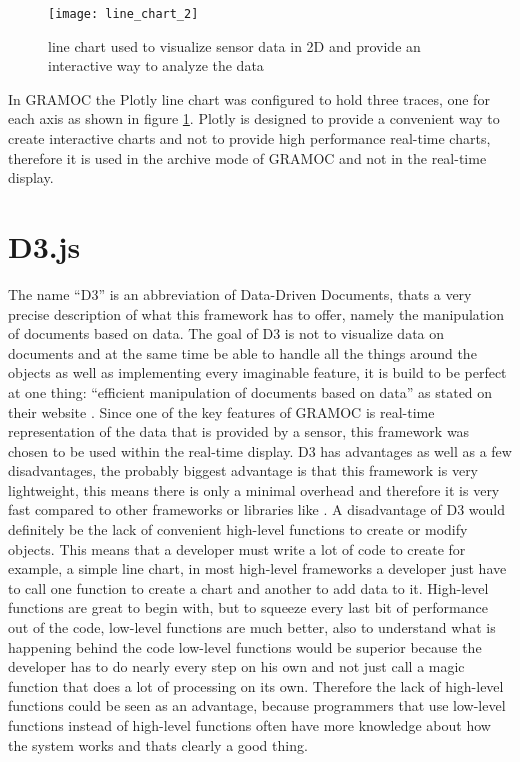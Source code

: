\begin{figure}[H]
    \centering
    \texttt{[image: line\_chart\_2]}
    \caption{line chart used to visualize sensor data in 2D and provide an interactive way to analyze the data}
    \label{fig:plotlylinechart}
\end{figure}

In GRAMOC the Plotly line chart was configured to hold three traces, one for each axis as shown in figure \ref{fig:plotlylinechart}. Plotly is designed to provide a convenient way to create interactive charts and not to provide high performance real-time charts, therefore it is used in the archive mode of GRAMOC and not in the real-time display.

\section{D3.js}
The name ``D3'' is an abbreviation of Data-Driven Documents, thats a very precise description of what this framework has to offer, namely the manipulation of documents based on data. The goal of D3 is not to visualize data on documents and at the same time be able to handle all the things around the objects as well as implementing every imaginable feature, it is build to be perfect at one thing: ``efficient manipulation of documents based on data'' as stated on their website \autocite{d3}. Since one of the key features of GRAMOC is real-time representation of the data that is provided by a sensor, this framework was chosen to be used within the real-time display. D3 has advantages as well as a few disadvantages, the probably biggest advantage is that this framework is very lightweight, this means there is only a minimal overhead and therefore it is very fast compared to other frameworks or libraries like . A disadvantage of D3 would definitely be the lack of convenient high-level functions to create or modify objects. This means that a developer must write a lot of code to create for example, a simple line chart, in most high-level frameworks a developer just have to call one function to create a chart and another to add data to it. High-level functions are great to begin with, but to squeeze every last bit of performance out of the code, low-level functions are much better, also to understand what is happening behind the code low-level functions would be superior because the developer has to do nearly every step on his own and not just call a magic function that does a lot of processing on its own. Therefore the lack of high-level functions could be seen as an advantage, because programmers that use low-level functions instead of high-level functions often have more knowledge about how the system works and thats clearly a good thing.

